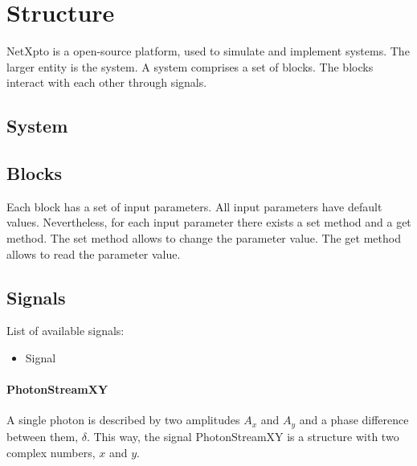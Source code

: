 
\chapter{Structure}

\begin{refsection}

NetXpto is a open-source platform, used to simulate and implement systems.
The larger entity is the system.
A system comprises a set of blocks.
The blocks interact with each other through signals.

\section{System}

\section{Blocks}

Each block has a set of input parameters.
All input parameters have default values.
Nevertheless, for each input parameter there exists a set method and a get method.
The set method allows to change the parameter value.
The get method allows to read the parameter value.


\section{Signals}

List of available signals:

\begin{itemize}
    \item Signal

\end{itemize}

\subsubsection{PhotonStreamXY}
A single photon is described by two amplitudes $A_x$ and $A_y$ and a phase difference between them, $\delta$. This way, the signal PhotonStreamXY is a structure with two complex numbers, $x$ and $y$.



\end{refsection}

